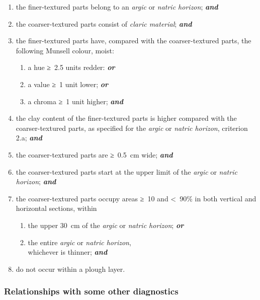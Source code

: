 \documentclass[
  letterpaper,
  DIV=11,
  numbers=noendperiod]{scrreprt}
\providecommand{\tightlist}{%
  \setlength{\itemsep}{0pt}\setlength{\parskip}{0pt}}\usepackage{longtable,booktabs,array}
\begin{document}
\begin{enumerate}
\def\labelenumi{\arabic{enumi}.}
\tightlist
\item
  the finer-textured parts belong to an \emph{argic} or \emph{natric
  horizon}; \textbf{\emph{and}}
\item
  the coarser-textured parts consist of \emph{claric material};
  \textbf{\emph{and}}
\item
  the finer-textured parts have, compared with the coarser-textured
  parts, the following Munsell colour, moist:

  \begin{enumerate}
  \def\labelenumii{\alph{enumii}.}
  \tightlist
  \item
    a hue ≥~2.5 units redder: \textbf{\emph{or}}
  \item
    a value ≥~1 unit lower; \textbf{\emph{or}}
  \item
    a chroma ≥~1 unit higher; \textbf{\emph{and}}
  \end{enumerate}
\item
  the clay content of the finer-textured parts is higher compared with
  the coarser-textured parts, as specified for the \emph{argic} or
  \emph{natric horizon}, criterion 2.a; \textbf{\emph{and}}
\item
  the coarser-textured parts are ≥~0.5~cm wide; \textbf{\emph{and}}
\item
  the coarser-textured parts start at the upper limit of the
  \emph{argic} or \emph{natric horizon}; \textbf{\emph{and}}
\item
  the coarser-textured parts occupy areas ≥~10 and \textless~90\% in
  both vertical and horizontal sections, within

  \begin{enumerate}
  \def\labelenumii{\alph{enumii}.}
  \tightlist
  \item
    the upper 30~cm of the \emph{argic} or \emph{natric horizon};
    \textbf{\emph{or}}
  \item
    the entire \emph{argic} or \emph{natric horizon},\\
    whichever is thinner; \textbf{\emph{and}}
  \end{enumerate}
\item
  do not occur within a plough layer.
\end{enumerate}

\hypertarget{relationships-with-some-other-diagnostics-45}{%
\subsubsection{Relationships with some other
diagnostics}\label{relationships-with-some-other-diagnostics-45}}
\end{document}
